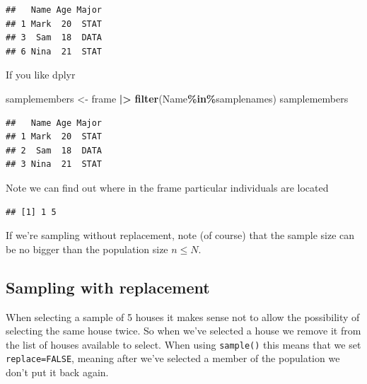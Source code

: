 \documentclass[
]{book}
\newenvironment{Shaded}{\begin{snugshade}}{\end{snugshade}}
\newcommand{\FunctionTok}[1]{\textcolor[rgb]{0.13,0.29,0.53}{\textbf{#1}}}
\newcommand{\NormalTok}[1]{#1}
\newcommand{\OtherTok}[1]{\textcolor[rgb]{0.56,0.35,0.01}{#1}}
\newcommand{\SpecialCharTok}[1]{\textcolor[rgb]{0.81,0.36,0.00}{\textbf{#1}}}
\newcommand{\StringTok}[1]{\textcolor[rgb]{0.31,0.60,0.02}{#1}}
\begin{document}
\begin{verbatim}
##   Name Age Major
## 1 Mark  20  STAT
## 3  Sam  18  DATA
## 6 Nina  21  STAT
\end{verbatim}

If you like dplyr

\begin{Shaded}
\begin{Highlighting}[]
\NormalTok{samplemembers }\OtherTok{\textless{}{-}}\NormalTok{ frame }\SpecialCharTok{|\textgreater{}} 
  \FunctionTok{filter}\NormalTok{(Name}\SpecialCharTok{\%in\%}\NormalTok{samplenames)}
\NormalTok{samplemembers}
\end{Highlighting}
\end{Shaded}

\begin{verbatim}
##   Name Age Major
## 1 Mark  20  STAT
## 2  Sam  18  DATA
## 3 Nina  21  STAT
\end{verbatim}

Note we can find out where in the frame particular individuals are located

\begin{Shaded}
\end{Shaded}

\begin{verbatim}
## [1] 1 5
\end{verbatim}

If we're sampling without replacement, note (of course) that the sample
size can be no bigger than the population size \(n\leq N\).

\subsection{Sampling with replacement}\label{sampling-with-replacement}

When selecting a sample of 5 houses it makes sense not to allow the possibility
of selecting the same house twice. So when we've selected a house we remove
it from the list of houses available to select. When using \texttt{sample()} this means
that we set \texttt{replace=FALSE}, meaning after we've selected a member of the population
we don't put it back again.
\end{document}
